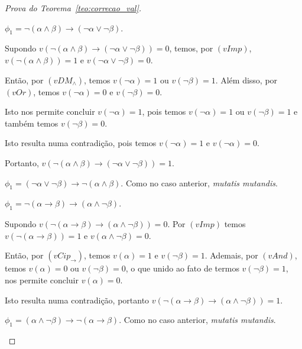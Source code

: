 \begin{proof}[Prova do Teorema~\ref{teo:correcao_val}]
\begin{provaporcasos}
\begin{provaporsubcasos}
                    \subcasodeprova{} $\phi_{1} = \neg(\alpha \land \beta) \to (\neg \alpha \lor \neg \beta)$. 
                    
                    Supondo $v(\neg(\alpha \land \beta) \to (\neg \alpha \lor \neg \beta)) = 0$, temos, por $(vImp)$, $v(\neg(\alpha \land \beta)) = 1$ e $v(\neg \alpha \lor \neg \beta) = 0$. 
                    
                    Então, por $(vDM_{\land})$, temos $v(\neg \alpha) = 1$ ou $v(\neg \beta) = 1$. Além disso, por $(vOr)$, temos $v(\neg \alpha) = 0$ e $v(\neg \beta) = 0$. 
                    
                    Isto nos permite concluir $v(\neg \alpha) = 1$, pois temos $v(\neg \alpha) = 1$ ou $v(\neg \beta) = 1$ e também temos $v(\neg \beta) = 0$. 
                    
                    Isto resulta numa contradição, pois temos $v(\neg \alpha) = 1$ e $v(\neg \alpha) = 0$. 
                    
                    Portanto, $v(\neg(\alpha \land \beta) \to (\neg \alpha \lor \neg \beta)) = 1$.
    
                    \subcasodeprova{} $\phi_{1} = (\neg \alpha \lor \neg \beta) \to \neg (\alpha \land \beta)$. Como no caso anterior, \textit{mutatis mutandis}.
    
                    \subcasodeprova{} $\phi_{1} = \neg (\alpha \to \beta) \to(\alpha \land \neg \beta)$. 
                    
                    Supondo $v(\neg (\alpha \to \beta) \to (\alpha \land \neg \beta)) = 0$. Por $(vImp)$ temos $v(\neg (\alpha \to \beta)) = 1$ e $v(\alpha \land \neg \beta) = 0$. 
                    
                    Então, por $(vCip_{\to})$, temos $v(\alpha) = 1$ e $v(\neg \beta) = 1$. Ademais, por $(vAnd)$, temos $v(\alpha) = 0$ ou $v(\neg \beta) = 0$, o que unido ao fato de termos $v(\neg \beta) = 1$, nos permite concluir $v(\alpha) = 0$. 
                    
                    Isto resulta numa contradição, portanto $v(\neg (\alpha \to \beta) \to (\alpha \land \neg \beta)) = 1$.
    
                    \subcasodeprova{} $\phi_{1} = (\alpha \land \neg \beta) \to \neg(\alpha \to \beta)$. Como no caso anterior, \textit{mutatis mutandis}.
                    
                \end{provaporsubcasos}
    

\end{provaporcasos}
\end{proof}
